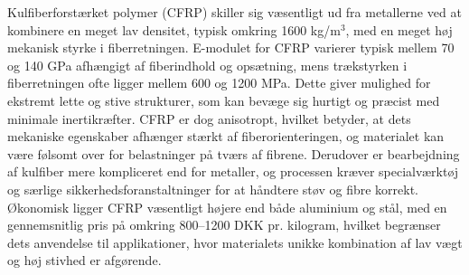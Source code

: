 Kulfiberforstærket polymer (CFRP) skiller sig væsentligt ud fra metallerne ved at kombinere en meget lav densitet, typisk omkring 1600 kg/m\(^3\), med en meget høj mekanisk styrke i fiberretningen. E-modulet for CFRP varierer typisk mellem 70 og 140 GPa afhængigt af fiberindhold og opsætning, mens trækstyrken i fiberretningen ofte ligger mellem 600 og 1200 MPa. Dette giver mulighed for ekstremt lette og stive strukturer, som kan bevæge sig hurtigt og præcist med minimale inertikræfter. CFRP er dog anisotropt, hvilket betyder, at dets mekaniske egenskaber afhænger stærkt af fiberorienteringen, og materialet kan være følsomt over for belastninger på tværs af fibrene. Derudover er bearbejdning af kulfiber mere kompliceret end for metaller, og processen kræver specialværktøj og særlige sikkerhedsforanstaltninger for at håndtere støv og fibre korrekt. Økonomisk ligger CFRP væsentligt højere end både aluminium og stål, med en gennemsnitlig pris på omkring 800–1200 DKK pr. kilogram, hvilket begrænser dets anvendelse til applikationer, hvor materialets unikke kombination af lav vægt og høj stivhed er afgørende\parencite{Starr1995CarbonDatabook}.


\begin{comment}
    \begin{table}[H]
    \centering
    \caption{Materialeegenskaber}
    \begin{tabular}{|l|c|c|c|} \cline{2-4}
        \multicolumn{1}{c|}{~} & \rowcolor{lightgray!20} Aluminium & Stål & CFRP \\ \hline
        \multicolumn{1}{|l|}{ \cellcolor{aaublue} \textcolor{white}{E-modul}} & 69 GPa & 210 GPa & 70-140 GPa\\ \hline
        \multicolumn{1}{|l|}{\cellcolor{    aaublue} \textcolor{white}{Flydespænding $\sigma_y$}}& 190-210 MPa& 355 MPa&  -\\ \hline
        \multicolumn{1}{|l|}{\cellcolor{aaublue} \textcolor{white}{Trækstyrke}} & 215-250 MPa& 470-630 Mpa& 1000 MPa \\ \hline
        \multicolumn{1}{|l|}{\cellcolor{aaublue} \textcolor{white}{Densitet $\rho$}}& 2700 $kg/m^{3}$ & 7850 $kg/m^{3}$ & 1600 $kg/m^{3}$\\ \hline
    \end{tabular}
\end{table}
\end{comment}



